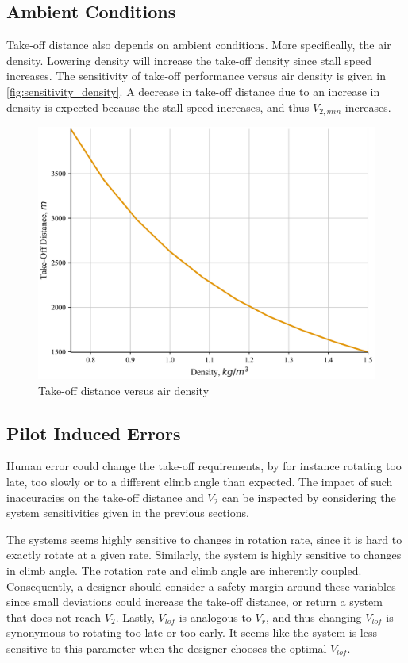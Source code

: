 \subsection{Ambient Conditions}\label{sec:ambientconditions}
Take-off distance also depends on ambient conditions. More specifically, the air density. Lowering density will increase the take-off density since stall speed increases. The sensitivity of take-off performance versus air density is given in \autoref{fig:sensitivity_density}. A decrease in take-off distance due to an increase in density is expected because the stall speed increases, and thus $V_{2,min}$ increases.

\begin{figure}[!ht]
    \centering
    \includegraphics[width=0.5\linewidth]{figures/E9X_BFL_density_sensitivity.png}
    \caption{Take-off distance versus air density}
    \label{fig:sensitivity_density}
\end{figure}

\subsection{Pilot Induced Errors}\label{sec:piloterrors}
Human error could change the take-off requirements, by for instance rotating too late, too slowly or to a different climb angle than expected. The impact of such inaccuracies on the take-off distance and $V_2$ can be inspected by considering the system sensitivities given in the previous sections. 

The systems seems highly sensitive to changes in rotation rate, since it is hard to exactly rotate at a given rate. Similarly, the system is highly sensitive to changes in climb angle. The rotation rate and climb angle are inherently coupled. Consequently, a designer should consider a safety margin around these variables since small deviations could increase the take-off distance, or return a system that does not reach $V_2$. Lastly, $V_{lof}$ is analogous to $V_r$, and thus changing $V_{lof}$ is synonymous to rotating too late or too early. It seems like the system is less sensitive to this parameter when the designer chooses the optimal $V_{lof}$.

